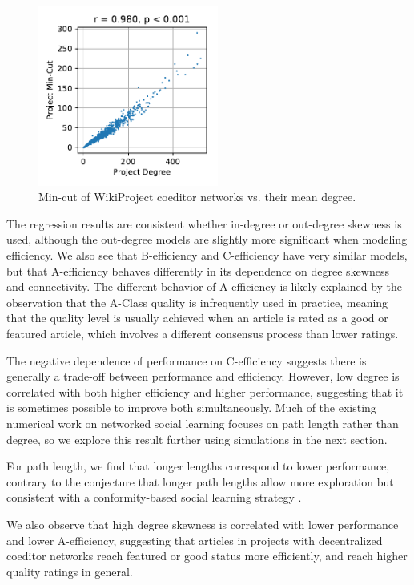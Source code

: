 \begin{figure}
\centering
\includegraphics[width=2.33in,height=2.33in]{fig-degree-mincut.pdf}
\caption{
Min-cut of WikiProject coeditor networks vs. their mean degree.
\label{fig:degree-mincut}
}
\end{figure}

The regression results are consistent whether in-degree or out-degree skewness is used,
although the out-degree models are slightly more significant when modeling efficiency.
We also see that B-efficiency and C-efficiency have very similar models, but that A-efficiency behaves
differently in its dependence on degree skewness and connectivity.
The different behavior of A-efficiency is likely explained by the observation that the A-Class quality is
infrequently used in practice, meaning that the quality level is usually achieved when an article is rated
as a good or featured article, which involves a different consensus process than lower ratings.

The negative dependence of performance on C-efficiency suggests there is generally a trade-off between
performance and efficiency.
However, low degree is correlated with both higher efficiency and higher performance,
suggesting that it is sometimes possible to improve both simultaneously.
Much of the existing numerical work on networked social learning focuses on path length rather than degree,
so we explore this result further using simulations in the next section.

For path length, we find that longer lengths correspond to lower performance, contrary to the conjecture
that longer path lengths allow more exploration \cite{mason_propagation_2008}
but consistent with a conformity-based social learning strategy \cite{barkoczi_social_2016}.

We also observe that high degree skewness is correlated with lower performance and lower A-efficiency,
suggesting that articles in projects with decentralized coeditor networks reach featured or good status
more efficiently, and reach higher quality ratings in general.

